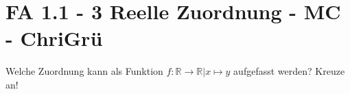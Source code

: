 \section{FA 1.1 - 3 Reelle Zuordnung - MC - ChriGrü}

\begin{beispiel}[FA 1.1]{1} %
Welche Zuordnung kann als Funktion $f: \mathbb{R} \rightarrow \mathbb{R} | x\mapsto y$ aufgefasst werden? Kreuze an!			
\end{beispiel}